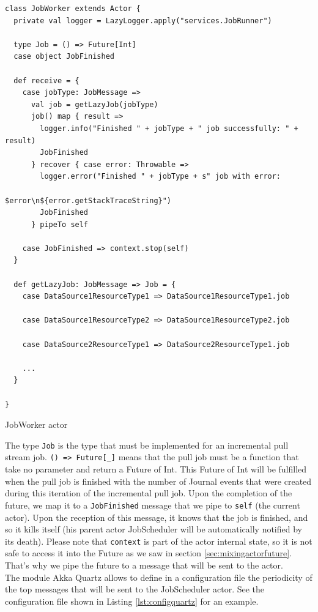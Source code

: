 \begin{listing}[h]
\begin{verbatim}
class JobWorker extends Actor {
  private val logger = LazyLogger.apply("services.JobRunner")
  
  type Job = () => Future[Int]
  case object JobFinished
  
  def receive = {
    case jobType: JobMessage =>
      val job = getLazyJob(jobType)
      job() map { result =>
        logger.info("Finished " + jobType + " job successfully: " + result)
        JobFinished
      } recover { case error: Throwable =>
        logger.error("Finished " + jobType + s" job with error: 
                                  $error\n${error.getStackTraceString}")
        JobFinished
      } pipeTo self
    
    case JobFinished => context.stop(self)
  }

  def getLazyJob: JobMessage => Job = {
    case DataSource1ResourceType1 => DataSource1ResourceType1.job

    case DataSource1ResourceType2 => DataSource1ResourceType2.job

    case DataSource2ResourceType1 => DataSource2ResourceType1.job

    ...
  }
  
}
\end{verbatim}
\caption{JobWorker actor}
\label{lst:akkajobworker}
\end{listing}

The type \verb|Job| is the type that must be implemented for an incremental pull stream job. \verb|() => Future[_]| means that the pull job must be a function that take no
parameter and return a Future of Int. This Future of Int will be fulfilled when the pull job is finished with the number of Journal events that were created during this iteration
of the incremental pull job. Upon the completion of the future, we map it to a \verb|JobFinished| message that we pipe to \verb|self| (the current actor). Upon the reception
of this message, it knows that the job is finished, and so it kills itself (his parent actor JobScheduler will be automatically notified by its death). Please note that
\verb|context| is part of the actor internal state, so it is not safe to access it into the Future as we saw in section \ref{sec:mixingactorfuture}. That's why we pipe the future to
a message that will be sent to the actor.
\\

The module Akka Quartz allows to define in a configuration file the periodicity of the top messages that will be sent to the JobScheduler actor. See the configuration 
file shown in Listing \ref{lst:configquartz} for an example.

